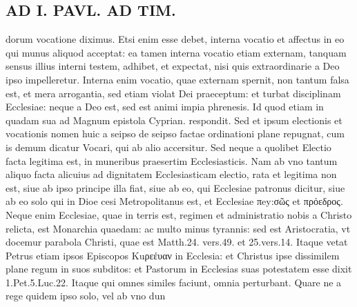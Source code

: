 \documentclass{article}
\begin{document}
\begin{pages}
\section*{AD I. PAVL. AD TIM. }
\marginpar{[ p.340 ]}\pstart dorum vocatione diximus. Etsi enim esse debet, interna vocatio et affectus in eo qui munus aliquod acceptat: ea tamen interna vocatio etiam externam, tanquam sensus illius interni testem, adhibet, et expectat, nisi quis extraordinarie a Deo ipso impelleretur. Interna enim vocatio, quae externam spernit, non tantum falsa est, et mera arrogantia, sed etiam violat Dei praeceptum: et turbat disciplinam Ecclesiae: neque a Deo est, sed est animi impia phrenesis. Id quod etiam in quadam sua ad Magnum epistola Cyprian. respondit. Sed et ipsum electionis et vocationis nomen huic a seipso de seipso factae ordinationi plane repugnat, cum is demum dicatur Vocari, qui ab alio accersitur. Sed neque a quolibet Electio facta legitima est, in muneribus praesertim Ecclesiasticis. Nam ab vno tantum aliquo facta alicuius ad dignitatem Ecclesiasticam electio, rata et legitima non est, siue ab ipso principe illa fiat, siue ab eo, qui Ecclesiae patronus dicitur, siue ab eo solo qui in Dioe cesi Metropolitanus est, et Ecclesiae πey:σῶς et πρόεδρος. Neque enim Ecclesiae, quae in terris est, regimen et administratio nobis a Christo relicta, est Monarchia quaedam: ac multo minus tyrannis: sed est Aristocratia, vt docemur parabola Christi, quae est Matth.24. vers.49. et 25.vers.14. Itaque vetat Petrus etiam ipsos Episcopos Kuρεέυαν in Ecclesia: et Christus ipse dissimilem plane regum in suos subditos: et Pastorum in Ecclesias suas potestatem esse dixit 1.Pet.5.Luc.22. Itaque qui omnes similes faciunt, omnia perturbant. Quare ne a rege quidem ipso solo, vel ab vno dun\pend

\end{pages}
\end{document}
